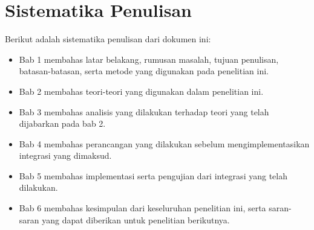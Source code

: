 \section{Sistematika Penulisan}

Berikut adalah sistematika penulisan dari dokumen ini:

\begin{itemize}
	\item Bab 1 membahas latar belakang, rumusan masalah, tujuan penulisan, batasan-batasan, serta metode yang digunakan pada penelitian ini.
	\item Bab 2 membahas teori-teori yang digunakan dalam penelitian ini.
	\item Bab 3 membahas analisis yang dilakukan terhadap teori yang telah dijabarkan pada bab 2.
	\item Bab 4 membahas perancangan yang dilakukan sebelum mengimplementasikan integrasi yang dimaksud.
	\item Bab 5 membahas implementasi serta pengujian dari integrasi yang telah dilakukan.
	\item Bab 6 membahas kesimpulan dari keseluruhan penelitian ini, serta saran-saran yang dapat diberikan untuk penelitian berikutnya.
\end{itemize}